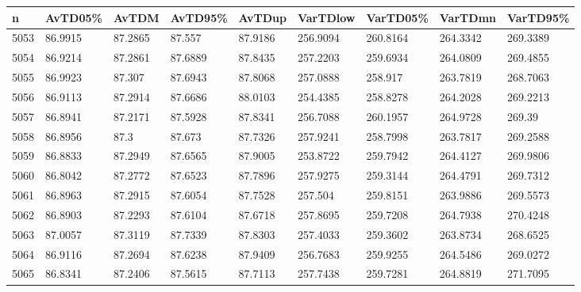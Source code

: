 \documentclass[a4paper,11pt]{article}
\begin{document}

\fontsize{6}{7.2}\selectfont
\begin{tabularx}{\textwidth}{|l|X|X|X|X|X|X|X|X|}
\hline
n & AvTD05\% & AvTDM & AvTD95\% & AvTDup & VarTDlow & VarTD05\% & VarTDmn & VarTD95\% \\ \hline
5053 & 86.9915 & 87.2865 & 87.557 & 87.9186 & 256.9094 & 260.8164 & 264.3342 & 269.3389 \\ \hline
5054 & 86.9214 & 87.2861 & 87.6889 & 87.8435 & 257.2203 & 259.6934 & 264.0809 & 269.4855 \\ \hline
5055 & 86.9923 & 87.307 & 87.6943 & 87.8068 & 257.0888 & 258.917 & 263.7819 & 268.7063 \\ \hline
5056 & 86.9113 & 87.2914 & 87.6686 & 88.0103 & 254.4385 & 258.8278 & 264.2028 & 269.2213 \\ \hline
5057 & 86.8941 & 87.2171 & 87.5928 & 87.8341 & 256.7088 & 260.1957 & 264.9728 & 269.39 \\ \hline
5058 & 86.8956 & 87.3 & 87.673 & 87.7326 & 257.9241 & 258.7998 & 263.7817 & 269.2588 \\ \hline
5059 & 86.8833 & 87.2949 & 87.6565 & 87.9005 & 253.8722 & 259.7942 & 264.4127 & 269.9806 \\ \hline
5060 & 86.8042 & 87.2772 & 87.6523 & 87.7896 & 257.9275 & 259.3144 & 264.4791 & 269.7312 \\ \hline
5061 & 86.8963 & 87.2915 & 87.6054 & 87.7528 & 257.504 & 259.8151 & 263.9886 & 269.5573 \\ \hline
5062 & 86.8903 & 87.2293 & 87.6104 & 87.6718 & 257.8695 & 259.7208 & 264.7938 & 270.4248 \\ \hline
5063 & 87.0057 & 87.3119 & 87.7339 & 87.8303 & 257.4033 & 259.3602 & 263.8734 & 268.6525 \\ \hline
5064 & 86.9116 & 87.2694 & 87.6238 & 87.9409 & 256.7683 & 259.9255 & 264.5486 & 269.0272 \\ \hline
5065 & 86.8341 & 87.2406 & 87.5615 & 87.7113 & 257.7438 & 259.7281 & 264.8819 & 271.7095 \\ \hline

\end{tabularx}
\end{document}
